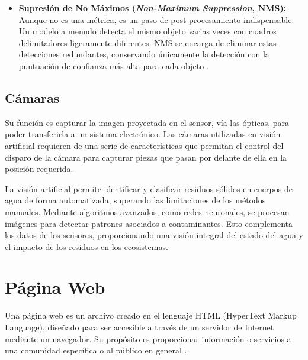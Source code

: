 \begin{itemize}
    \item \textbf{Supresión de No Máximos (\textit{Non-Maximum Suppression}, NMS):} Aunque no es una métrica, es un paso de post-procesamiento indispensable. Un modelo a menudo detecta el mismo objeto varias veces con cuadros delimitadores ligeramente diferentes. NMS se encarga de eliminar estas detecciones redundantes, conservando únicamente la detección con la puntuación de confianza más alta para cada objeto \cite{sapkota2025yolo}.
\end{itemize}














\subsection{Cámaras}

Su función es capturar la imagen proyectada en el sensor, vía las ópticas, para poder transferirla a un sistema electrónico. Las cámaras utilizadas en visión artificial requieren de una serie de características que permitan el control del disparo de la cámara para capturar piezas que pasan por delante de ella  en la posición requerida.


La visión artificial permite identificar y clasificar residuos sólidos en cuerpos de agua de forma automatizada, superando las limitaciones de los métodos manuales. Mediante algoritmos avanzados, como redes neuronales, se procesan imágenes para detectar patrones asociados a contaminantes. Esto complementa los datos de los sensores, proporcionando una visión integral del estado del agua y el impacto de los residuos en los ecosistemas.


\section{Página Web}
Una página web es un archivo creado en el lenguaje HTML (HyperText Markup Language), diseñado para ser accesible a través de un servidor de Internet mediante un navegador. Su propósito es proporcionar información o servicios a una comunidad específica o al público en general \cite{redalyc2006}.

